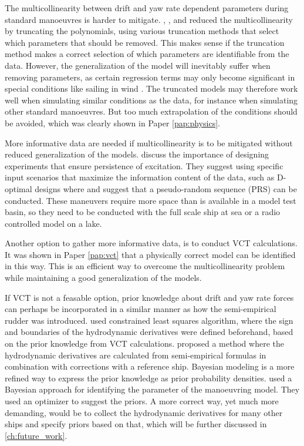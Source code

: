 The multicollinearity between drift and yaw rate dependent parameters during standard manoeuvres is harder to mitigate. \textcite{abkowitzMEASUREMENTHYDRODYNAMICCHARACTERISTICS1980}, \textcite{luoParameterIdentificationShip2016} \textcite{xuUncertaintyAnalysisHydrodynamic2019}, and \textcite{liuPhysicsinformedIdentificationMarine2024} reduced the multicollinearity by  truncating the polynomials, using various truncation methods that select which parameters that should be removed. This makes sense if the truncation method makes a correct selection of which parameters are identifiable from the data. However, the generalization of the model will inevitably suffer when removing parameters, as certain regression terms may only become significant in special conditions like sailing in wind \cite{abkowitzMEASUREMENTHYDRODYNAMICCHARACTERISTICS1980}. The truncated models may therefore work well when simulating similar conditions as the data, for instance when simulating other standard manoeuvres. But too much extrapolation of the conditions should be avoided, which was clearly shown in Paper \ref{pap:physics}. 

More informative data are needed if multicollinearity is to be mitigated without reduced generalization of the models. \textcite{yoonIdentificationHydrodynamicCoefficients2003} discuss the importance of designing experiments that ensure persistence of excitation. They suggest using specific input scenarios that maximize the information content of the data, such as D-optimal designs where \textcite{wangOptimalDesignExcitation2020} and \textcite{millerShipModelIdentification2021} suggest that a pseudo-random sequence (PRS) can be conducted. These
maneuvers require more space than is available in a model test basin, so they need to be conducted with the full scale ship at sea or a radio controlled model on a lake.

Another option to gather more informative data, is to conduct VCT calculations. It was shown in Paper \ref{pap:vct} that a physically correct model can be identified in this way. This is an efficient way to overcome the multicollinearity problem while maintaining a good generalization of the models. 

If VCT is not a feasable option, prior knowledge about drift and yaw rate forces can perhaps be incorporated in a similar manner as how the semi-empirical rudder was introduced. \textcite{chillcceDatadrivenSystemIdentification2023} used constrained least squares algorithm, where the sign and boundaries of the hydrodynamic derivatives were defined beforehand, based on the prior knowledge from VCT calculations. \textcite{taimuri6DoFManeuveringModel2020} proposed a method where the hydrodynamic derivatives are calculated from semi-empirical formulas in combination with corrections with a reference ship.
Bayesian modeling is a more refined way to express the prior knowledge as prior probability densities. \textcite{xueHydrodynamicParameterIdentification2020} used a Bayesian approach for identifying the parameter of the manoeuvring model. They used an optimizer to suggest the priors. A more correct way, yet much more demanding, would be to collect the hydrodynamic derivatives for many other ships and specify priors based on that, which will be further discussed in \autoref{ch:future_work}.
